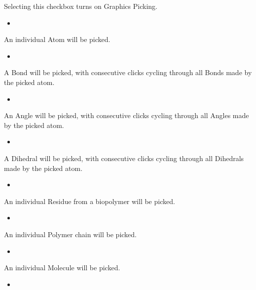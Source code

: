 \documentclass[letterpaper,11pt,english]{sphinxmanual}
\begin{document}
Selecting this checkbox turns on Graphics Picking.
\begin{itemize}
\item {} 

\end{itemize}

An individual Atom will be picked.
\begin{itemize}
\item {} 

\end{itemize}

A Bond will be picked, with consecutive clicks cycling through all Bonds made by the picked atom.
\begin{itemize}
\item {} 

\end{itemize}

An Angle will be picked, with consecutive clicks cycling through all Angles made by the picked atom.
\begin{itemize}
\item {} 

\end{itemize}

A Dihedral will be picked, with consecutive clicks cycling through all Dihedrals made by the picked atom.
\begin{itemize}
\item {} 

\end{itemize}

An individual Residue from a biopolymer will be picked.
\begin{itemize}
\item {} 

\end{itemize}

An individual Polymer chain will be picked.
\begin{itemize}
\item {} 

\end{itemize}

An individual Molecule will be picked.
\begin{itemize}
\item {} 

\end{itemize}
\end{document}
